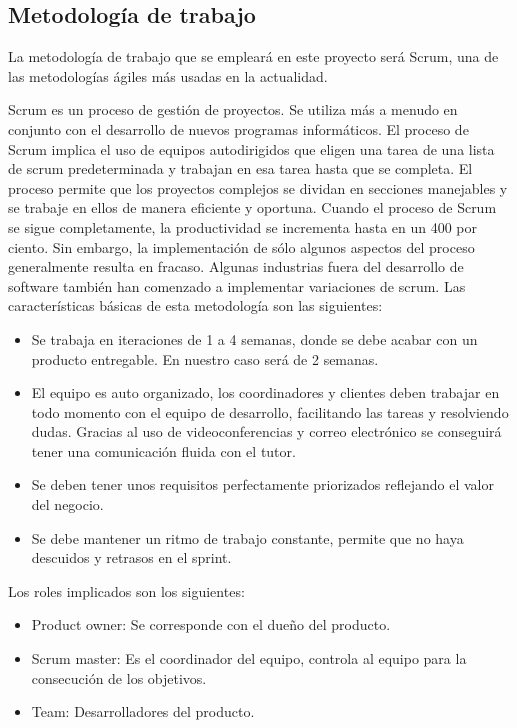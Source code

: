 \subsection{Metodología de trabajo}

La metodología de trabajo que se empleará en este proyecto será Scrum\cite{sutherland}, una de las metodologías ágiles más usadas en la actualidad\cite{ellis}. 

Scrum es un proceso de gestión de proyectos. Se utiliza más a menudo en conjunto con el desarrollo de nuevos programas informáticos. El proceso de Scrum implica el uso de equipos autodirigidos que eligen una tarea de una lista de scrum predeterminada y trabajan en esa tarea hasta que se completa. El proceso permite que los proyectos complejos se dividan en secciones manejables y se trabaje en ellos de manera eficiente y oportuna. Cuando el proceso de Scrum se sigue completamente, la productividad se incrementa hasta en un 400 por ciento. Sin embargo, la implementación de sólo algunos aspectos del proceso generalmente resulta en fracaso. Algunas industrias fuera del desarrollo de software también han comenzado a implementar variaciones de scrum. 
Las características básicas de esta metodología son las siguientes: 
\begin{itemize}
    \item Se trabaja en iteraciones de 1 a 4 semanas, donde se debe acabar con un producto entregable. En nuestro caso será de 2 semanas. 
    \item El equipo es auto organizado, los coordinadores y clientes deben trabajar en todo momento con el equipo de desarrollo, facilitando las tareas y resolviendo dudas. Gracias al uso de videoconferencias y correo electrónico se conseguirá tener una comunicación fluida con el tutor. 
    \item Se deben tener unos requisitos perfectamente priorizados reflejando el valor del negocio. 
    \item Se debe mantener un ritmo de trabajo constante, permite que no haya descuidos y retrasos en el sprint. 
\end{itemize}

Los roles implicados son los siguientes: 
\begin{itemize}
    \item Product owner: Se corresponde con el dueño del producto. 
    \item Scrum master: Es el coordinador del equipo, controla al equipo para la consecución de los objetivos.  
    \item Team: Desarrolladores del producto. 
\end{itemize}

